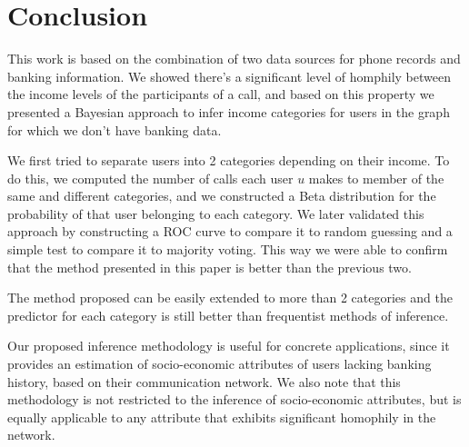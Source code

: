 \section{Conclusion}

This work is based on the combination of two data sources for phone records and banking information. We showed there's a significant level of homphily between the income levels of the participants of a call, and based on this property we presented a Bayesian approach to infer income categories for users in the graph for which we don't have banking data.

We first tried to separate users into 2 categories depending on their income. To do this, we computed the number of calls each user \( u \) makes to member of the same and different categories, and we constructed a Beta distribution for the probability of that user belonging to each category. We later validated this approach by constructing a ROC curve to compare it to random guessing and a simple test to compare it to majority voting. This way we were able to confirm that the method presented in this paper is better than the previous two.

The method proposed can be easily extended to more than 2 categories and the predictor for each category is still better than frequentist methods of inference.

Our proposed inference methodology is useful for concrete applications, since it provides an estimation of socio-economic attributes of users lacking banking history, based on their communication network. We also note that this methodology is not restricted to the inference of socio-economic attributes, but is equally applicable to any attribute that exhibits significant homophily in the network.

%
%
%
%
%
%

